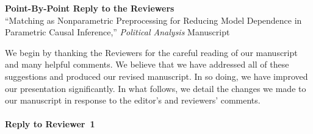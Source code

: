 \documentclass[11pt]{article}
\begin{document}

\begin{center}
  {\bf \Large Point-By-Point Reply to the Reviewers}\\
  ``Matching as Nonparametric Preprocessing for Reducing Model
  Dependence in Parametric Causal Inference,'' {\it Political
  Analysis} Manuscript
\end{center}

We begin by thanking the Reviewers for the careful reading of our
manuscript and many helpful comments.  We believe that we have
addressed all of these suggestions and produced our revised
manuscript. In so doing, we have improved our presentation
significantly. In what follows, we detail the changes we made to our
manuscript in response to the editor's and reviewers' comments.

\paragraph{Reply to Reviewer~1}
\end{document}
